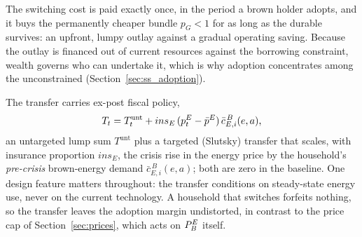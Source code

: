 The switching cost is paid exactly once, in the period a brown holder adopts, and
it buys the permanently cheaper bundle $p_G<1$ for as long as the durable
survives: an upfront, lumpy outlay against a gradual operating saving. Because the outlay is financed out of current
resources against the borrowing constraint, wealth governs who can undertake it,
which is why adoption concentrates among the unconstrained
(Section~\ref{sec:ss_adoption}).

The transfer carries ex-post fiscal policy,
%
\begin{equation}
T_t=T^{\mathrm{unt}}_t+ins_E\,(p^{E}_t-\bar p^E)\,\bar c^{\,B}_{E,i}(e, a),
\label{eq:transfer-hh}
\end{equation}
%
an untargeted lump sum $T^{\mathrm{unt}}$ plus a targeted (Slutsky) transfer that
scales, with insurance proportion $ins_E$, the crisis rise in the energy price by the
household's
\emph{pre-crisis} brown-energy demand $\bar c^{\,B}_{E,i}(e, a)$; both are zero in the
baseline. One design feature matters throughout: the transfer conditions on
steady-state energy use, never on the current technology. A household that switches
forfeits nothing, so the transfer leaves the adoption margin undistorted, in
contrast to the price cap of Section~\ref{sec:prices}, which acts on $P^{E}_{B}$ itself.

